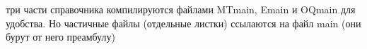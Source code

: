 три части справочника компилируются файлами MTmain, Emain и OQmain для удобства. Но частичные файлы (отдельные листки) ссылаются на файл main (они бурут от него преамбулу)